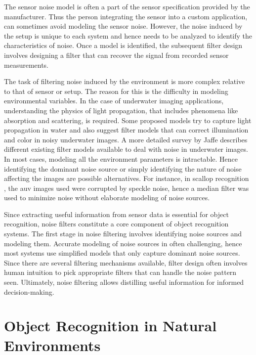 The sensor noise model is often a part of the sensor specification provided by the manufacturer. 
Thus the person integrating the sensor into a custom application, can sometimes avoid modeling the sensor noise. 
However, the noise induced by the setup is unique to each system and hence needs to be analyzed to identify the characteristics of noise.
Once a model is identified, the subsequent filter design involves designing a filter that can recover the signal from recorded sensor measurements.

The task of filtering noise induced by the environment is more complex relative to that
of sensor or setup.
The reason for this is the difficulty in modeling environmental variables. 
In the case of underwater imaging applications, understanding the physics of 
light propagation, that includes phenomena like absorption and scattering, is required. Some proposed models \cite{garcia, ahlen} try to 
capture light propagation in water and also suggest filter models that can correct illumination and color in noisy underwater images. A more detailed survey
by Jaffe \cite{jaffe} describes different existing filter models available to deal with noise in underwater images.
In most cases, modeling all the environment parameters is intractable. Hence identifying the dominant noise source or simply identifying the nature of noise affecting the images are possible alternatives.
For instance, in scallop recognition \cite{prasanna_aslo}, the \gls{auv} images used were corrupted by speckle noise, hence a median filter \cite{despeckle} was used to minimize noise without elaborate modeling of noise sources.

Since extracting useful information from sensor data is essential for object recognition, noise filters constitute a core component of object recognition systems. The first stage in noise filtering involves identifying noise sources and modeling them. Accurate modeling of noise sources in often challenging, hence most systems use simplified models that only capture dominant noise sources. Since there are several filtering mechanisms available, filter design often involves human intuition to pick appropriate filters that can handle the noise pattern seen. Ultimately, noise filtering allows distilling useful information for informed decision-making.

\section{Object Recognition in Natural Environments}


